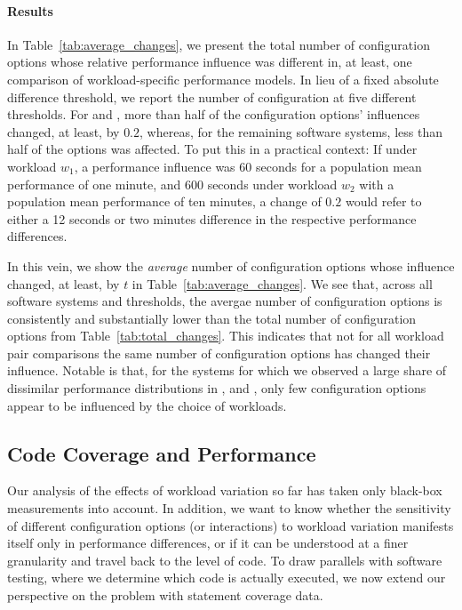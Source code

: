 \paragraph*{Results} 
In Table~\ref{tab:average_changes}, we present the total number of configuration options whose relative performance influence was different in, at least, one comparison of workload-specific performance models. In lieu of a fixed absolute difference threshold, we report the number of configuration at five different thresholds. For \jumper and \kanzi, more than half of the configuration options' influences changed, at least, by $0.2$, whereas, for the remaining software systems, less than half of the options was affected.
{\color{blue}To put this in a practical context: If under workload $w_1$, a performance influence was 60 seconds for a population mean performance of one minute, and 600 seconds under workload $w_2$ with a population mean performance of ten minutes, a change of $0.2$ would refer to either a 12 seconds or two minutes difference in the respective performance differences.}

{\color{blue} 
In this vein, we show the \textit{average} number of configuration options whose influence changed, at least, by $t$ in Table~\ref{tab:average_changes}. We see that, across all software systems and thresholds, the avergae number of configuration options is consistently and substantially lower than the total number of configuration options from Table~\ref{tab:total_changes}. This indicates that not for all workload pair comparisons the same number of configuration options has changed their influence. Notable is that, for the systems for which we observed a large share of dissimilar performance distributions in , \dconvert and \htwo, only few configuration options appear to be influenced by the choice of workloads.
}
\vspace{1em}


\subsection{Code Coverage and Performance}\label{sec:rq3}
Our analysis of the effects of workload variation so far has taken only black-box measurements into account. In addition, we want to know whether the sensitivity of different configuration options (or interactions) to workload variation manifests itself only in performance differences, or if it can be understood at a finer granularity and travel back to the level of code. To draw parallels with software testing, where we determine which code is actually executed, we now extend our perspective on the problem with statement coverage data. 


